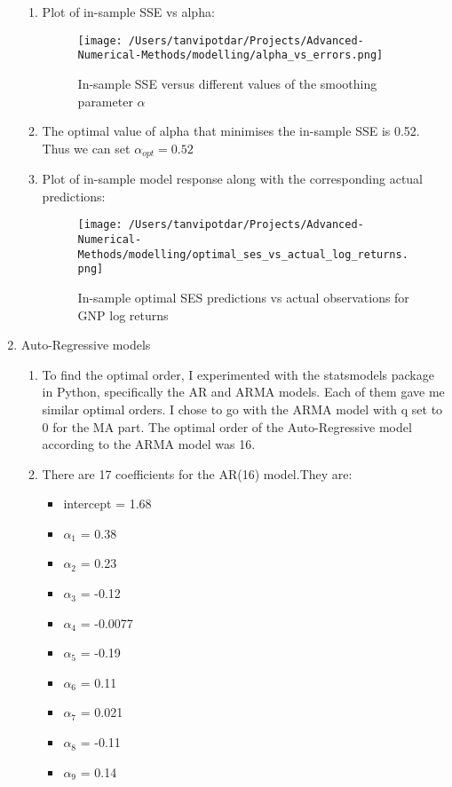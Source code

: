 \documentclass{article}
\begin{document}
\begin{enumerate}[label=1.\arabic*]
\begin{enumerate}[label=(\alph*)]
\item Plot of in-sample SSE vs alpha:
\begin{figure}[!htbp]
    \centering
    \hspace*{-1cm}
    \texttt{[image: /Users/tanvipotdar/Projects/Advanced-Numerical-Methods/modelling/alpha\_vs\_errors.png]}
    \caption{In-sample SSE versus different values of the smoothing parameter $\alpha$}
\end{figure}
\item The optimal value of alpha that minimises the in-sample SSE is 0.52. Thus we can set $\alpha_{opt}=0.52$
\item Plot of in-sample model response along with the corresponding actual predictions:
\begin{figure}[!htbp]
    \centering
    \vspace*{-2cm}
    \hspace*{-1cm}
    \texttt{[image: /Users/tanvipotdar/Projects/Advanced-Numerical-Methods/modelling/optimal\_ses\_vs\_actual\_log\_returns.png]}
    \caption{In-sample optimal SES predictions vs actual observations for GNP log returns}
\end{figure}
\end{enumerate}
\item Auto-Regressive models
\begin{enumerate}[label=(\alph*)]
\item To find the optimal order, I experimented with the statsmodels package in Python, specifically the AR and ARMA models. Each of them gave me similar optimal orders. I chose to go with the ARMA model with q set to 0 for the MA part.  The optimal order of the Auto-Regressive model according to the ARMA model was 16. 
\item There are 17 coefficients for the AR(16) model.They are:
\begin{itemize}
    \item intercept = 1.68
    \item $\alpha_1$ = 0.38
    \item $\alpha_2$ = 0.23
    \item $\alpha_3$ = -0.12
    \item $\alpha_4$ = -0.0077
    \item $\alpha_5$ = -0.19
    \item $\alpha_6$ = 0.11
    \item $\alpha_7$ = 0.021
    \item $\alpha_8$ = -0.11
    \item $\alpha_9$ = 0.14

\end{itemize}
\end{enumerate}
\end{enumerate}
\end{document}
